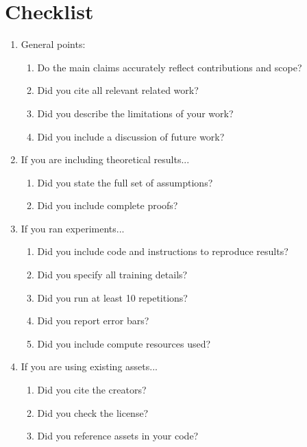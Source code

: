 \documentclass{article}
\begin{document}
\section*{Checklist}
\begin{enumerate}

\item General points:
\begin{enumerate}
  \item Do the main claims accurately reflect contributions and scope?
    \answerYes{}
  \item Did you cite all relevant related work?
    \answerYes{}
  \item Did you describe the limitations of your work?
  \item Did you include a discussion of future work?
\end{enumerate}

\item If you are including theoretical results...
\begin{enumerate}
  \item Did you state the full set of assumptions?
    \answerNA{}
  \item Did you include complete proofs?
    \answerNA{}
\end{enumerate}

\item If you ran experiments...
\begin{enumerate}
  \item Did you include code and instructions to reproduce results?
  \item Did you specify all training details?
  \item Did you run at least 10 repetitions?
  \item Did you report error bars?
  \item Did you include compute resources used?
\end{enumerate}

\item If you are using existing assets...
\begin{enumerate}
  \item Did you cite the creators?
  \item Did you check the license?
  \item Did you reference assets in your code?
    \answerYes{}
\end{enumerate}

\end{enumerate}
\end{document}
